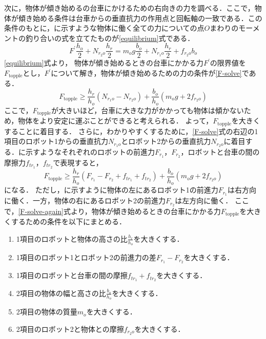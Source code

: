 次に，物体が傾き始めるの台車にかけるための右向きの力を調べる．ここで，物体が傾き始める条件は台車からの垂直抗力の作用点と回転軸の一致である．この条件のもとに，に示すような物体に働く全ての力についての点$O$まわりのモーメントの釣り合いの式を立てたものが\eqref{equilibrium}式である．
\begin{equation}
F^{\prime} \frac{h_{o}}{2}+N_{r_{2} o} \frac{h_{r}}{2}=m_{o} g \frac{b_{o}}{2}+N_{r_{1} o} \frac{h_{r}}{2}+f_{r_{2} o} b_{o}
\label{equilibrium}
\end{equation}
\eqref{equilibrium}式より，
物体が傾き始めるときの台車にかかる力$F^{\prime}$の限界値を$F_{\text{topple}}$とし，$F^{\prime}$について解き，物体が傾き始めるための力の条件が\eqref{F-solve}である．
\begin{equation}
    F_{\text{topple}}\geq\frac{h_{r}}{h_{o}}\left(N_{r_{1} o}-N_{r_{2} o}\right)+\frac{b_{o}}{h_{o}}\left(m_{o} g+2 f_{r_2 o}\right)
    \label{F-solve}
\end{equation}
ここで，$F_{\text{topple}}$が大きいほど，台車に大きな力がかかっても物体は傾かないため，物体をより安定に運ぶことができると考えられる．
よって，$F_{\text{topple}}$を大きくすることに着目する．
さらに，わかりやすくするために，\eqref{F-solve}式の右辺の1項目のロボット1からの垂直抗力$N_{r_1 o}$とロボット2からの垂直抗力$N_{r_2 o}$に着目する．に示すようなそれぞれのロボットの前進力$F_{r_1}$，$F_{r_2}$，ロボットと台車の間の摩擦力$f_{tr_1}$，$f_{tr_2}$で表現すると，
\begin{equation}
    F_{\text{topple}}\geq\frac{h_{r}}{h_{o}}\left(F_{r_{1}}-F_{r_{2}}+f_{t{r_1}}+f_{t{r_2}}\right)+\frac{b_{o}}{h_{o}}\left(m_{o} g+2 f_{r_2 o}\right)
    \label{F-solve-again}
\end{equation}
になる．
ただし，に示すように物体の左にあるロボット1の前進力$F_{r_{1}}$は右方向に働く．一方，物体の右にあるロボット2の前進力$F_{r_{2}}$は左方向に働く．
ここで，\eqref{F-solve-again}式より，物体が傾き始めるときの台車にかかる力$F_{\text{topple}}$を大きくするための条件を以下にまとめる．
\begin{enumerate}
    \item 1項目のロボットと物体の高さの比$\frac{h_{r}}{h_{o}}$を大きくする．
    \item 1項目のロボット1とロボット2の前進力の差$F_{r_{1}}-F_{r_{2}}$を大きくする．
    \item 1項目のロボットと台車の間の摩擦$f_{t{r_1}}+f_{t{r_2}}$を大きくする．
    \item 2項目の物体の幅と高さの比$\frac{b_{o}}{h_{o}}$を大きくする．
    \item 2項目の物体の質量$m_{o}$を大きくする．
    \item 2項目のロボット2と物体との摩擦$f_{r_2 o}$を大きくする．  
\end{enumerate}
